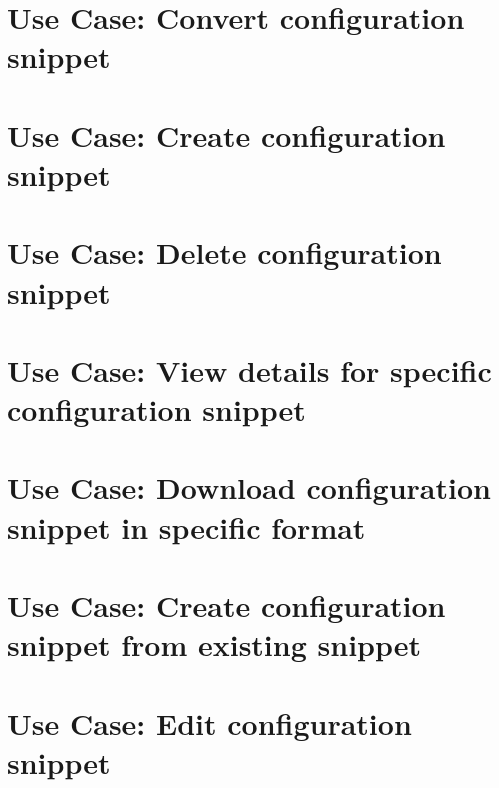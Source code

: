 \documentclass[twoside]{book}
\newcommand{\+}{\discretionary{\mbox{\scriptsize$\hookleftarrow$}}{}{}}
\begin{document}
\chapter{Use Case\+: Convert configuration snippet}
\label{md_doc_usecases_snippet_sharing_UC_convert_snippet}
\hypertarget{md_doc_usecases_snippet_sharing_UC_convert_snippet}{}

\chapter{Use Case\+: Create configuration snippet}
\label{md_doc_usecases_snippet_sharing_UC_create_snippet}
\hypertarget{md_doc_usecases_snippet_sharing_UC_create_snippet}{}

\chapter{Use Case\+: Delete configuration snippet}
\label{md_doc_usecases_snippet_sharing_UC_delete_snippet}
\hypertarget{md_doc_usecases_snippet_sharing_UC_delete_snippet}{}

\chapter{Use Case\+: View details for specific configuration snippet}
\label{md_doc_usecases_snippet_sharing_UC_details_snippet}
\hypertarget{md_doc_usecases_snippet_sharing_UC_details_snippet}{}

\chapter{Use Case\+: Download configuration snippet in specific format}
\label{md_doc_usecases_snippet_sharing_UC_download_snippet}
\hypertarget{md_doc_usecases_snippet_sharing_UC_download_snippet}{}

\chapter{Use Case\+: Create configuration snippet from existing snippet}
\label{md_doc_usecases_snippet_sharing_UC_duplicate_snippet}
\hypertarget{md_doc_usecases_snippet_sharing_UC_duplicate_snippet}{}

\chapter{Use Case\+: Edit configuration snippet}
\label{md_doc_usecases_snippet_sharing_UC_edit_snippet}
\hypertarget{md_doc_usecases_snippet_sharing_UC_edit_snippet}{}

\end{document}
